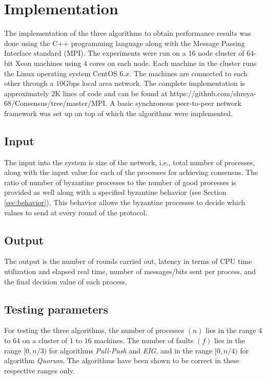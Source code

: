 ﻿\section{Implementation}
\label{sec:eval}

The implementation of the three algorithms to obtain performance results
was done using the C++ programming language along with the Message
Passing Interface standard (MPI).  The experiments were run on a 16 node
cluster of $64$-bit Xeon machines using $4$ cores on each node.
Each machine in the cluster runs the Linux operating system CentOS $6.x$.
The machines are connected to each other through a $10$Gbps local area
network. The complete implementation is approximately $2$K lines of code
and can be found at
https://github.com/shreya-68/Consensus/tree/master/MPI. A basic
synchronous peer-to-peer network framework was set up on top of which
the algorithms were implemented.

\subsection{Input}
The input into the system is size of the network, i.e., total number of processes, along with the input value for each of the processes for achieving consensus. The ratio of number of byzantine processes to the number of good processes is provided as well along with a specified byzantine behavior (see Section \ref{sec:behavior}). This behavior allows the byzantine processes to decide which values to send at every round of the protocol. 

\subsection{Output}
The output is the number of rounds carried out, latency in terms of CPU time utilization and elapsed real time, number of messages/bits sent per process, and the final decision value of each process. 

\subsection{Testing parameters}
For testing the three algorithms, the number of processes $(n)$ lies in the range $4$ to $64$ on a cluster of $1$ to $16$ machines. The number of faults $(f)$ lies in the range $[0, n/3)$ for algorithms \textit{Pull-Push} and \textit{EIG}, and in the range $[0, n/4)$ for algorithm \textit{Quorum}. The algorithms have been shown to be correct in these respective ranges only.

